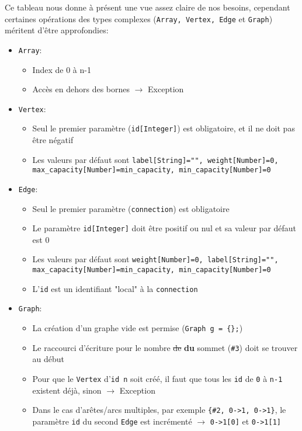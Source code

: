 \documentclass[french]{article}
\begin{document}
	Ce tableau nous donne à présent une vue assez claire de nos besoins, cependant certaines opérations des types complexes (\texttt{Array, Vertex, Edge} et \texttt{Graph}) méritent d'être approfondies:
	
	\begin{itemize}
		\item \texttt{Array}: 
		\begin{itemize}
			\item Index de 0 à n-1
			\item Accès en dehors des bornes $\rightarrow$ Exception
		\end{itemize}
		\item \texttt{Vertex}:
		\begin{itemize}
			\item Seul le premier paramètre (\texttt{id[Integer]}) est obligatoire, et il ne doit pas être négatif
			\item Les valeurs par défaut sont \texttt{label[String]="", weight[Number]=0, max\_capacity[Number]=min\_capacity, min\_capacity[Number]=0}
		\end{itemize}
		\item \texttt{Edge}: 
		\begin{itemize}
			\item Seul le premier paramètre (\texttt{connection}) est obligatoire
			\item Le paramètre \texttt{id[Integer]} doit être positif ou nul et sa valeur par défaut est 0
			\item Les valeurs par défaut sont \texttt{weight[Number]=0, label[String]="", max\_capacity[Number]=min\_capacity, min\_capacity[Number]=0}
			\item L'\texttt{id} est un identifiant "local" à la \texttt{connection}
		\end{itemize}
		\item \texttt{Graph}: 
		\begin{itemize}
			\item La création d'un graphe vide est permise (\texttt{Graph g = \{\};})
			\item Le raccourci d'écriture pour le nombre \sout{de} \textbf{du} sommet (\texttt{\#3}) doit se trouver au début
			\item Pour que le \texttt{Vertex} d'\texttt{id n} soit créé, il faut que tous les \texttt{id} de \texttt{0} à \texttt{n-1} existent déjà, sinon $\rightarrow$ Exception 
			\item Dans le cas d'arêtes/arcs multiples, par exemple \texttt{\{\#2, 0->1, 0->1\}}, le paramètre \texttt{id} du second \texttt{Edge} est incrémenté $\rightarrow$ \texttt{0->1[0]} et \texttt{0->1[1]}

\end{itemize}
\end{itemize}
\end{document}

